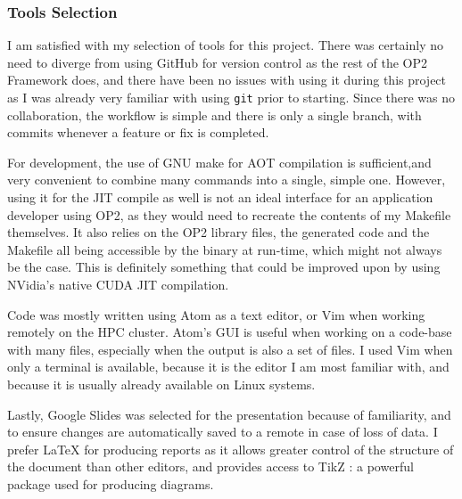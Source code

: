 \subsubsection{Tools Selection}
I am satisfied with my selection of tools for this project. There was certainly no need to diverge from using GitHub for version control as the rest of the OP2 Framework does, and there have been no issues with using it during this project as I was already very familiar with using \verb|git| prior to starting. Since there was no collaboration, the workflow is simple and there is only a single branch, with commits whenever a feature or fix is completed.
\par
For development, the use of GNU make for AOT compilation is sufficient,and very convenient to combine many commands into a single, simple one. However, using it for the JIT compile as well is not an ideal interface for an application developer using OP2, as they would need to recreate the contents of my Makefile themselves. It also relies on the OP2 library files, the generated code and the Makefile all being accessible by the binary at run-time, which might not always be the case. This is definitely something that could be improved upon by using NVidia's native CUDA JIT compilation.
\par
Code was mostly written using Atom \cite{atom} as a text editor, or Vim \cite{vim} when working remotely on the HPC cluster. Atom's GUI is useful when working on a code-base with many files, especially when the output is also a set of files. I used Vim when only a terminal is available, because it is the editor I am most familiar with, and because it is usually already available on Linux systems.
\par
Lastly, Google Slides was selected for the presentation because of familiarity, and to ensure changes are automatically saved to a remote in case of loss of data. I prefer LaTeX for producing reports as it allows greater control of the structure of the document than other editors, and provides access to TikZ \cite{tikz}: a powerful package used for producing diagrams.
